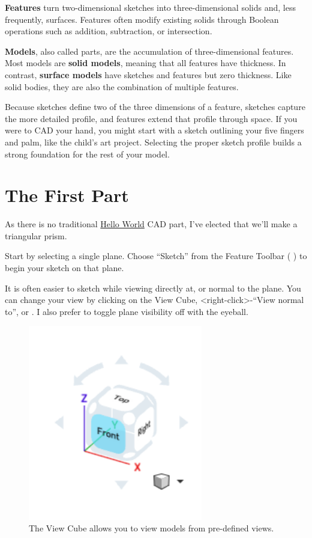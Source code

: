 {\bf Features} turn two-dimensional sketches into three-dimensional solids and, less frequently, surfaces. Features often modify existing solids through Boolean operations such as addition, subtraction, or intersection.

{\bf Models}, also called parts, are the accumulation of three-dimensional features. Most models are {\bf solid models}, meaning that all features have thickness.
In contrast, {\bf surface models} have sketches and features but zero thickness. Like solid bodies, they are also the combination of multiple features.

Because sketches define two of the three dimensions of a feature, sketches capture the more detailed profile, and features extend that profile through space. If you were to CAD your hand, you might start with a sketch outlining your five fingers and palm, like the child's art project. Selecting the proper sketch profile builds a strong foundation for the rest of your model.

\section{The First Part}
As there is no traditional \href{https://en.wikipedia.org/wiki/%22Hello,_World!%22_program}{Hello World}
CAD part, I've elected that we'll make a triangular prism.

Start by selecting a single plane. Choose ``Sketch'' from the Feature Toolbar ( ) to begin your sketch on that plane. 

It is often easier to sketch while viewing directly at, or normal to the plane. You can change your view by clicking on the View Cube, <right-click>-``View normal to'', or . I also prefer to toggle plane visibility off with the eyeball.

\begin{figure}[ht!]
\centerline{\includegraphics[width=3in]{figs/chap01_view_cube.png}}
\caption{The View Cube allows you to view models from pre-defined views.}
\label{view_cube}
\end{figure}

